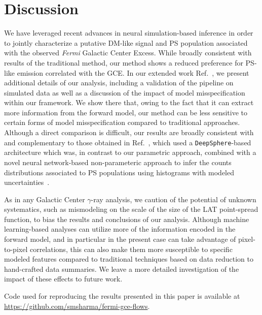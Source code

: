 \documentclass[]{article}
\newcommand{\Fermi}{\emph{Fermi}\xspace}
\begin{document}
\section{Discussion}
\label{sec:conclusions}

We have leveraged recent advances in neural simulation-based inference in order to jointly characterize a putative DM-like signal and PS population associated with the observed \Fermi Galactic Center Excess. While broadly consistent with results of the traditional method, our method shows a reduced preference for PS-like emission correlated with the GCE. In our extended work Ref.~\cite{Mishra-Sharma:2021oxe}, we present additional details of our analysis, including a validation of the pipeline on simulated data as well as a discussion of the impact of model misspecification within our framework. We show there that, owing to the fact that it can extract more information from the forward model, our method can be less sensitive to certain forms of model misspecification compared to traditional approaches.
Although a direct comparison is difficult, our results are broadly consistent with and complementary to those obtained in Ref.~\cite{List:2021aer}, which used a \texttt{DeepSphere}-based architecture which was, in contrast to our parametric approach, combined with a novel neural network-based non-parameteric approach to infer the counts distributions associated to PS populations using histograms with modeled uncertainties~\cite{List2021}.

As in any Galactic Center $\gamma$-ray analysis, we caution of the potential of unknown systematics, such as mismodeling on the scale of the size of the LAT point-spread function, to bias the results and conclusions of our analysis. Although machine learning-based analyses can utilize more of the information encoded in the forward model, and in particular in the present case can take advantage of pixel-to-pixel correlations, this can also make them more susceptible to specific modeled features compared to traditional techniques based on data reduction to hand-crafted data summaries. We leave a more detailed investigation of the impact of these effects to future work.

Code used for reproducing the results presented in this paper is available at \url{https://github.com/smsharma/fermi-gce-flows}. 
\end{document}
